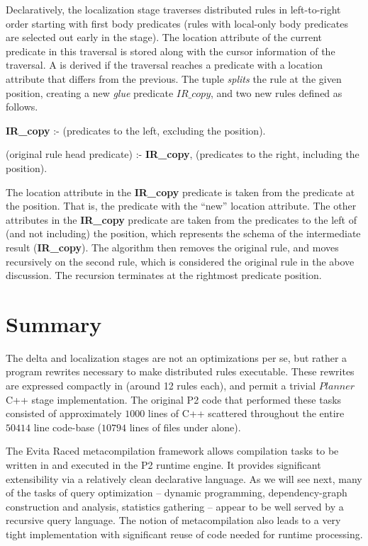 Declaratively, the localization stage traverses distributed rules in
left-to-right order starting with first body predicates (rules with local-only
body predicates are selected out early in the stage).  The location attribute
of the current predicate in this traversal is stored along with the cursor
information of the traversal.  A  is derived if the traversal
reaches a predicate with a location attribute that differs from the previous.
The  tuple {\em splits} the rule at the given position, creating
a new {\em glue} predicate $IR\_copy$, and two new rules defined as follows.
\begin{CompactEnumerate} 
\item {\bf IR\_copy} :- (predicates to the left, excluding the  position).  
\item (original rule head predicate) :- {\bf IR\_copy}, (predicates to the right, including
  the  position).  
\end{CompactEnumerate} 
The location attribute in the {\bf IR\_copy} predicate is taken from the
predicate at the  position.  That is, the predicate with the
``new'' location attribute.  The other attributes in the {\bf IR\_copy}
predicate are taken from the predicates to the left of (and not including) the
 position, which represents the schema of the intermediate result
({\bf IR\_copy}).  The algorithm then removes the original rule, and moves
recursively on the second rule, which is considered the original rule in the
above discussion.  The recursion terminates at the rightmost predicate
position.

\section{Summary} 
\label{ch:evita:sec:summary} 

The delta and localization stages are not an optimizations per se, but rather a
program rewrites necessary to make distributed rules executable.  These
rewrites are expressed compactly in \OVERLOG (around 12 rules each), and permit
a trivial $Planner$ C++ stage implementation.  The original P2 code that
performed these tasks consisted of approximately $1000$ lines of C++ scattered
throughout the entire ~$50414$ line code-base ($10794$ lines of  files under
 alone).

The Evita Raced metacompilation framework allows \OVERLOG compilation tasks to
be written in \OVERLOG and executed in the P2 runtime engine.  It provides
significant extensibility via a relatively clean declarative language.  As we
will see next, many of the tasks of query optimization -- dynamic programming,
dependency-graph construction and analysis, statistics gathering -- appear to
be well served by a recursive query language.  The notion of metacompilation
also leads to a very tight implementation with significant reuse of code needed
for runtime processing.

